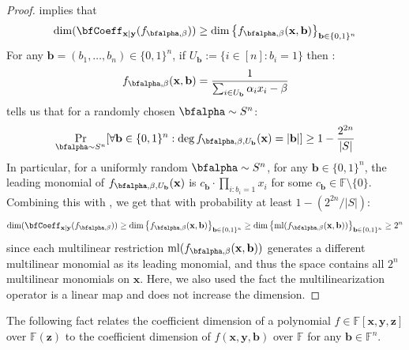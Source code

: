 \documentclass[11pt]{article}
\newcommand{\Boo}{\{0,1 \}}
\newcommand{\F}{\mathbb{F}}
\newcommand{\IPSLINp}{\mathrm{IPS}_{\mathrm{LIN}'}}
\newcommand{\roABP}{\mathrm{roABP}}
\begin{document}
\begin{proof}
     implies that $$\dim (\bfCoeff_{\mathbf{x}|\mathbf{y}}(f_{\bfalpha,\beta})) \geq \dim \left\{ f_{\bfalpha,\beta}(\mathbf{x},\mathbf{b}) \right\}_{\mathbf{b}\in \Boo^n}$$
    For any $\mathbf{b}=(b_1, \dots, b_n) \in \Boo^n$, if $U_{\mathbf{b}}:= \{i\in[n]: b_i = 1\}$ then : $$f_{\bfalpha,\beta}(\mathbf{x},\mathbf{b}) = \frac{1}{\sum_{i\in U_{\mathbf{b}}} \alpha_i x_i - \beta}$$
     tells us that for a randomly chosen $\bfalpha \sim S^n$: $$\Pr_{\bfalpha \sim S^n}[\forall \mathbf{b}\in\Boo^n:\deg{f_{\bfalpha,\beta,U_{\mathbf{b}}}(\mathbf{x})} = |\mathbf{b}|] \geq 1 -\frac{2^{2n}}{|S|}$$
    In particular, for a uniformly random $\bfalpha\sim S^n$, for any $\mathbf{b}\in \Boo^n$, the leading monomial of $f_{\bfalpha,\beta,U_{\mathbf{b}}}(\mathbf{x})$ is $c_\mathbf{b}\cdot \prod_{i:b_i = 1}x_i$ for some $c_\mathbf{b} \in \F\setminus\{0\}$. Combining this with , we get that with probability at least $1 - (2^{2n}/|S|)$: $$\dim (\bfCoeff_{\mathbf{x}|\mathbf{y}}(f_{\bfalpha,\beta}))\geq \dim \left\{ f_{\bfalpha,\beta}(\mathbf{x},\mathbf{b}) \right\}_{\mathbf{b}\in \Boo^n}\geq \dim \left\{ \operatorname{ml}(f_{\bfalpha,\beta}(\mathbf{x},\mathbf{b})) \right\}_{\mathbf{b}\in \Boo^n} \geq 2^n$$
    since each multilinear restriction $\operatorname{ml}(f_{\bfalpha,\beta}(\mathbf{x},\mathbf{b}))$ generates a different multilinear monomial as its leading monomial, and thus the space contains all $2^n$ multilinear monomials on $\mathbf{x}$. Here, we also used the fact the multilinearization operator is a linear map and does not increase the dimension.
\end{proof}


The following fact relates the coefficient dimension of a polynomial $f\in \F[\mathbf{x},\mathbf{y},\mathbf{z}]$ over $\F(\mathbf{z})$ to the coefficient dimension of $f(\mathbf{x},\mathbf{y},\mathbf{b})$ over $\F$ for any $\mathbf{b} \in \F^n$.  
\end{document}
